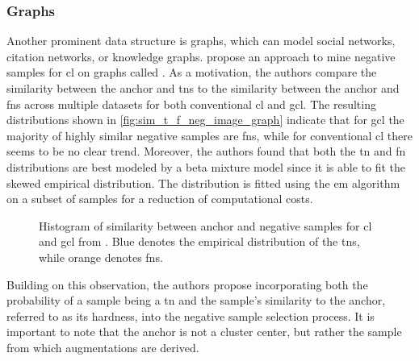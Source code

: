 \subsubsection{Graphs}\label{subsec:graph_distribution}

Another prominent data structure is graphs, which can model 
social networks, citation networks, or knowledge graphs.
\citet{progcl_2022} propose an approach to mine negative samples for \ac{cl} on graphs called \progcl{}. 
As a motivation, the authors compare the similarity between the anchor and \acp{tn} 
to the similarity between the anchor and \acp{fn} 
across multiple datasets for both conventional \ac{cl} and \ac{gcl}.
The resulting distributions shown in \autoref{fig:sim_t_f_neg_image_graph} 
indicate that for \ac{gcl} the majority of highly similar negative samples are \acp{fn}, 
while for conventional \ac{cl} there seems to be no clear trend.
Moreover, the authors found that both the \ac{tn} and \ac{fn} distributions are best modeled by a beta mixture model %
since it is able to fit the skewed empirical distribution.
The distribution is fitted using the \ac{em} algorithm on a subset of samples for a reduction of computational costs.

\begin{figure}%
    \centering
    \qquad
    \caption{Histogram of similarity between anchor and negative samples for \ac{cl} and \ac{gcl} from \citet{progcl_2022}.
    Blue denotes the empirical distribution of the \acp{tn}, while orange denotes \acp{fn}.}%
    \label{fig:sim_t_f_neg_image_graph}%
\end{figure}

Building on this observation, the authors propose incorporating both the probability of a sample being a \ac{tn} and 
the sample's similarity to the anchor, referred to as its hardness, into the negative sample selection process. 
It is important to note that the anchor is not a cluster center, 
but rather the sample from which augmentations are derived.

